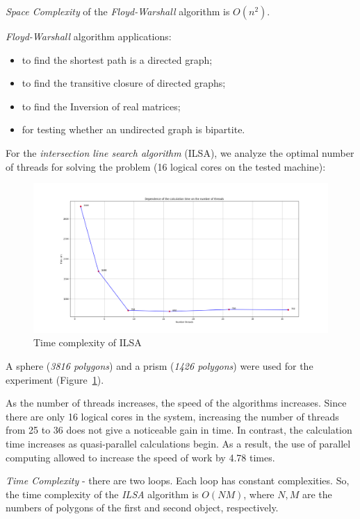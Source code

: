 \textit{Space Complexity} of the \textit{Floyd-Warshall} algorithm is $O(n^2)$.

\textit{Floyd-Warshall} algorithm applications:
\begin{itemize}
    \item to find the shortest path is a directed graph;
    \item to find the transitive closure of directed graphs;
    \item to find the Inversion of real matrices;
    \item for testing whether an undirected graph is bipartite.
\end{itemize}

For the \textit{intersection line search algorithm} (ILSA), we analyze the optimal number of threads for solving the problem (16 logical cores on the tested machine):

\begin{figure}[H]
    \center
    \includegraphics[width=\textwidth]{img/plot.png}
    \caption{Time complexity of ILSA}
    \label{ris:plot}
\end{figure}

A sphere (\textit{3816 polygons}) and a prism (\textit{1426 polygons}) were used for the experiment (Figure~\ref{ris:plot}).

As the number of threads increases, the speed of the algorithms increases.
Since there are only 16 logical cores in the system, increasing the number of threads from 25 to 36 does not give a noticeable gain in time.
In contrast, the calculation time increases as quasi-parallel calculations begin.
As a result, the use of parallel computing allowed to increase the speed of work by 4.78 times.

\textit{Time Complexity} - there are two loops.
Each loop has constant complexities.
So, the time complexity of the \textit{ILSA} algorithm is $O(NM)$, where $N, M$ are the numbers of polygons of the first and second object, respectively.

